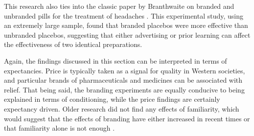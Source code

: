 This research also ties into the classic paper by Branthwaite on branded and unbranded pills for the treatment of headaches \cite{Branthwaite1981}. This experimental study, using an extremely large sample, found that branded placebos were more effective than unbranded placebos, suggesting that either advertising or prior learning can affect the effectiveness of two identical preparations. 

Again, the findings discussed in this section can be interpreted in terms of  expectancies. Price is typically taken as a signal for quality in Western societies, and particular brands of pharmaceuticals and medicines can be associated with relief. That being said, the branding experiments are equally conducive to being explained in terms of conditioning, while the price findings are certainly expectancy driven. Older research did not find any effects of familiarity, which would suggest that the effects of branding have either increased  in recent times or that familiarity alone is not enough \cite{Morris1974}.  









